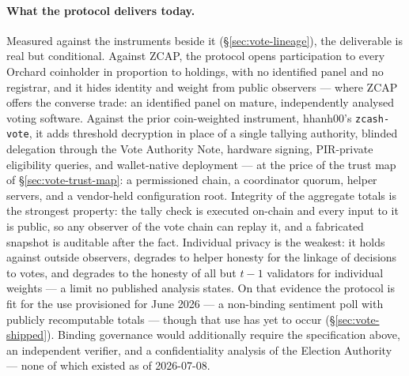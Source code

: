 \documentclass[11pt,a4paper]{article}
\theoremstyle{definition}
\begin{document}
\paragraph{What the protocol delivers today.} Measured against the
instruments beside it (\S\ref{sec:vote-lineage}), the deliverable is
real but conditional. Against ZCAP, the protocol opens participation to
every Orchard coinholder in proportion to holdings, with no identified
panel and no registrar, and it hides identity and weight from public
observers --- where ZCAP offers the converse trade: an identified panel
on mature, independently analysed voting software. Against the prior
coin-weighted instrument, hhanh00's \texttt{zcash-vote}, it adds
threshold decryption in place of a single tallying authority, blinded
delegation through the Vote Authority Note, hardware signing,
PIR-private eligibility queries, and wallet-native deployment --- at the
price of the trust map of \S\ref{sec:vote-trust-map}: a permissioned
chain, a coordinator quorum, helper servers, and a vendor-held
configuration root. Integrity of the aggregate totals is the strongest
property: the tally check is executed on-chain and every input to it is
public, so any observer of the vote chain can replay it, and a
fabricated snapshot is auditable after the fact. Individual privacy is
the weakest: it holds against outside observers, degrades to helper
honesty for the linkage of decisions to votes, and degrades to the
honesty of all but $t-1$ validators for individual weights --- a limit no
published analysis states. On that evidence the protocol is fit for the
use provisioned for June 2026 --- a non-binding sentiment poll with
publicly recomputable totals --- though that use has yet to occur
(\S\ref{sec:vote-shipped}). Binding governance would additionally
require the specification above, an independent verifier, and a
confidentiality analysis of the Election Authority --- none of which
existed as of 2026-07-08.
\end{document}
